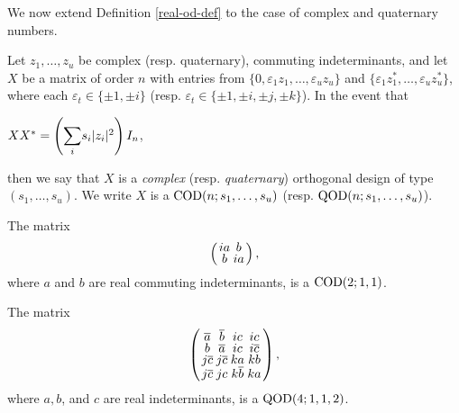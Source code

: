 \documentclass[../../../main]{subfiles}
\begin{document}
 We now extend Definition \ref{real-od-def} to the case of complex and quaternary numbers.
 
 \begin{defin}
  Let $z_1, \dots, z_u$ be complex (resp. quaternary), commuting indeterminants, and let $X$ be a matrix of order $n$ with entries from $\{0,\varepsilon_1z_1, \dots, \varepsilon_uz_u\}$ and $\{\varepsilon_1z_1^*, \dots, \varepsilon_uz_u^*\}$, where each $\varepsilon_t \in \{\pm 1, \pm i\}$ (resp. $\varepsilon_t \in \{\pm 1, \pm i, \pm j, \pm k\}$). In the event that
  \begin{defenum}
   \item\label{qod-od-def} $XX^* = \left( \ssum_is_i|z_i|^2 \right)I_n$,
  \end{defenum}
  then we say that $X$ is a {\it complex} (resp. {\it quaternary}) orthogonal design of type $(s_1,\dots,s_u)$. We write $X$ is a $\text{COD}(n;s_1,\dots,s_u)$ (resp. $\text{QOD}(n;s_1,\dots,s_u)$).
 \end{defin}
 
 \begin{ex}
  The matrix
  \begin{equation}
  \arraycolsep=1.25pt\def\arraystretch{0.625}
   \left(\begin{array}{cc}
    ia&b\\b&ia
   \end{array}\right),
  \end{equation}
  where $a$ and $b$ are real commuting indeterminants, is a $\text{COD}(2;1,1)$.
 \end{ex}
 
 \begin{ex}
  The matrix
  \begin{equation}
  \arraycolsep=1.25pt\def\arraystretch{0.625}
   \left(\begin{array}{cccc}
    \bar a&\bar b&ic&ic\\
    b&\bar a&ic&i\bar c\\
    j\bar c&j\bar c&ka&kb\\
    j\bar c&jc&k\bar b&ka
   \end{array}\right),
  \end{equation}
  where $a,b$, and $c$ are real indeterminants, is a $\text{QOD}(4;1,1,2)$.
 \end{ex}
 
 \dinkus
 
\end{document}
